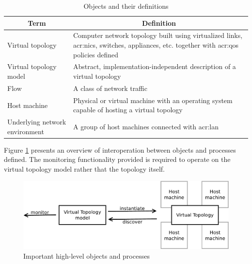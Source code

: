 \documentclass[11pt,openany]{book}
\begin{document}
      \begin{table}[H]
        \centering

        \begin{tabularx}{\textwidth}{|l|X|}
          \hline
          \multicolumn{1}{|c|}{Term}     & \multicolumn{1}{c|}{Definition}                                            \\
          \hline \hline
          Virtual topology               & Computer network topology built using virtualized links, \gls{acr:nic}s,
                                           switches, appliances, etc. together with \gls{acr:qos} policies defined    \\
          \hline
          Virtual topology model         & Abstract, implementation-independent description of a virtual topology     \\
          \hline
          Flow                           & A class of network traffic                                                 \\
          \hline
          Host machine                   & Physical or virtual machine with an operating system capable of hosting
                                           a virtual topology                                                         \\
          \hline
          Underlying network environment & A group of host machines connected with \gls{acr:lan}                      \\
          \hline
        \end{tabularx}
        
        \caption{Objects and their definitions}
        \label{tab:req:def-obj}
      \end{table}

      Figure \ref{fig:req:overview} presents an overview of interoperation between objects and processes defined. The
      monitoring functionality provided is required to operate on the virtual topology model rather that the topology
      itself.

      \begin{figure}[H]
        \centering
        \includegraphics[width=.7\textwidth]{img/req/overview.pdf}

        \caption{Important high-level objects and processes}
        \label{fig:req:overview}
      \end{figure}
\end{document}
